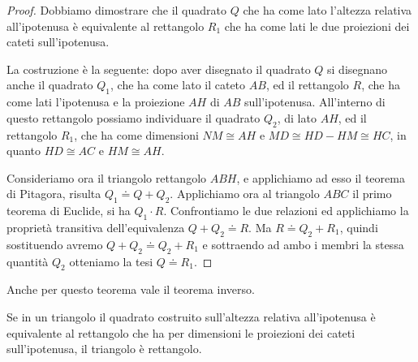 \begin{proof}
Dobbiamo dimostrare che il quadrato $Q$ che ha come lato l'altezza relativa all'ipotenusa è equivalente al rettangolo $R_1$ che ha come lati le due proiezioni dei cateti sull'ipotenusa.

La costruzione è la seguente: dopo aver disegnato il quadrato $Q$ si disegnano anche il quadrato $Q_1$, che ha come lato il cateto $AB$, ed il rettangolo $R$, che ha come lati l'ipotenusa e la proiezione $AH$ di $AB$ sull'ipotenusa. All'interno di questo rettangolo possiamo individuare il quadrato $Q_2$, di lato $AH$, ed il rettangolo $R_1$, che ha come dimensioni $NM\cong AH$ e $MD\cong HD-HM\cong HC$, in quanto $HD\cong AC$ e $HM\cong AH$.

Consideriamo ora il triangolo rettangolo $ABH$, e applichiamo ad esso il teorema di Pitagora, risulta $Q_1\doteq Q+Q_2$. Applichiamo ora al triangolo $ABC$ il primo teorema di Euclide, si ha $Q_1\cdot R$. Confrontiamo le due relazioni ed applichiamo la proprietà transitiva dell'equivalenza $Q+Q_2\doteq R$. Ma $R\doteq Q_2 + R_1$, quindi sostituendo avremo $Q+Q_2\doteq Q_2 + R_1$ e sottraendo ad ambo i membri la stessa quantità $Q_2$ otteniamo la tesi $Q\doteq R_1$.
\end{proof}

Anche per questo teorema vale il teorema inverso.

\begin{teorema}
Se in un triangolo il quadrato costruito sull'altezza relativa all'ipotenusa è equivalente al rettangolo che ha per dimensioni le proiezioni dei cateti sull'ipotenusa, il triangolo è rettangolo.
\end{teorema}


